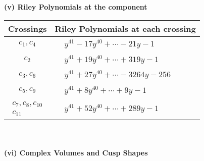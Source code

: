 \documentclass[1p]{elsarticle_modified}
\theoremstyle{definition}
\begin{document}
\newpage\renewcommand{\arraystretch}{1}
\flushleft \textbf{(v) Riley Polynomials at the component}\newline \\
\begin{tabular}{m{50pt}|m{274pt}}
Crossings & \hspace{64pt}Riley Polynomials at each crossing \\
\hline $$\begin{aligned}c_{1},c_{4}\end{aligned}$$&$\begin{aligned}
&y^{41}-17 y^{40}+\cdots-21 y-1
\end{aligned}$\\
\hline $$\begin{aligned}c_{2}\end{aligned}$$&$\begin{aligned}
&y^{41}+19 y^{40}+\cdots+319 y-1
\end{aligned}$\\
\hline $$\begin{aligned}c_{3},c_{6}\end{aligned}$$&$\begin{aligned}
&y^{41}+27 y^{40}+\cdots-3264 y-256
\end{aligned}$\\
\hline $$\begin{aligned}c_{5},c_{9}\end{aligned}$$&$\begin{aligned}
&y^{41}+8 y^{40}+\cdots+9 y-1
\end{aligned}$\\
\hline $$\begin{aligned}c_{7},c_{8},c_{10}\\c_{11}\end{aligned}$$&$\begin{aligned}
&y^{41}+52 y^{40}+\cdots+289 y-1
\end{aligned}$\\
\hline
\end{tabular}\\~\\
\newpage\flushleft \textbf{(vi) Complex Volumes and Cusp Shapes}
\end{document}

